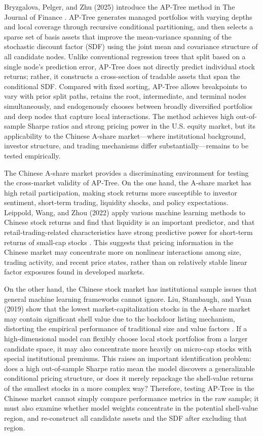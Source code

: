 \documentclass[12pt]{article}
\def\textit#1{#1}%
\begin{document}
Bryzgalova, Pelger, and Zhu (2025) introduce the AP-Tree method in \textit{The Journal of Finance} \cite{ref3}. AP-Tree generates managed portfolios with varying depths and local coverage through recursive conditional partitioning, and then selects a sparse set of basis assets that improve the mean-variance spanning of the stochastic discount factor (SDF) using the joint mean and covariance structure of all candidate nodes. Unlike conventional regression trees that split based on a single node's prediction error, AP-Tree does not directly predict individual stock returns; rather, it constructs a cross-section of tradable assets that span the conditional SDF. Compared with fixed sorting, AP-Tree allows breakpoints to vary with prior split paths, retains the root, intermediate, and terminal nodes simultaneously, and endogenously chooses between broadly diversified portfolios and deep nodes that capture local interactions. The method achieves high out-of-sample Sharpe ratios and strong pricing power in the U.S. equity market, but its applicability to the Chinese A-share market—where institutional background, investor structure, and trading mechanisms differ substantially—remains to be tested empirically.

The Chinese A-share market provides a discriminating environment for testing the cross-market validity of AP-Tree. On the one hand, the A-share market has high retail participation, making stock returns more susceptible to investor sentiment, short-term trading, liquidity shocks, and policy expectations. Leippold, Wang, and Zhou (2022) apply various machine learning methods to Chinese stock returns and find that liquidity is an important predictor, and that retail-trading-related characteristics have strong predictive power for short-term returns of small-cap stocks \cite{ref15}. This suggests that pricing information in the Chinese market may concentrate more on nonlinear interactions among size, trading activity, and recent price states, rather than on relatively stable linear factor exposures found in developed markets.

On the other hand, the Chinese stock market has institutional sample issues that general machine learning frameworks cannot ignore. Liu, Stambaugh, and Yuan (2019) show that the lowest market-capitalization stocks in the A-share market may contain significant shell value due to the backdoor listing mechanism, distorting the empirical performance of traditional size and value factors \cite{ref17}. If a high-dimensional model can flexibly choose local stock portfolios from a larger candidate space, it may also concentrate more heavily on micro-cap stocks with special institutional premiums. This raises an important identification problem: does a high out-of-sample Sharpe ratio mean the model discovers a generalizable conditional pricing structure, or does it merely repackage the shell-value returns of the smallest stocks in a more complex way? Therefore, testing AP-Tree in the Chinese market cannot simply compare performance metrics in the raw sample; it must also examine whether model weights concentrate in the potential shell-value region, and re-construct all candidate assets and the SDF after excluding that region.
\end{document}
